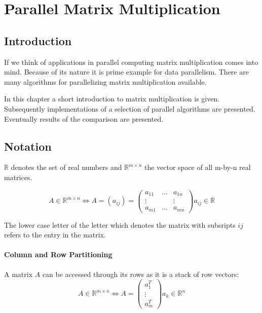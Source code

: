 \chapter{Parallel Matrix Multiplication}
\label{chap:matrix}
\section{Introduction}

If we think of applications in parallel computing matrix
multiplication comes into mind. Because of its nature it is prime
example for data parallelism. There are many algorithms for
parallelizing matrix multiplication available.


In this chapter a short introduction to matrix multiplication is
given. Subsequently implementations of a selection of parallel
algorithms are presented. Eventually results of the comparison are
presented.


\section{Notation}

$ \mathbb{R} $ denotes the set of real numbers and $ \mathbb{R}^{m
  \times n} $ the vector space of all m-by-n real matrices.

$$ A \in \mathbb{R}^{m \times n} \Longleftrightarrow A = (a_{ij}) = 
\left( \begin{array}{ccc}
a_{11} & \ldots & a_{1n} \\
\vdots &        & \vdots \\
a_{m1} & \ldots & a_{mn}
\end{array} \right)
a_{ij} \in \mathbb{R}
 $$

The lower case letter of the letter which denotes the matrix with
subsripts $ij$ refers to the entry in the matrix. 

\subsubsection{Column and Row Partitioning}

A matrix $A$ can be accessed through its rows as it is a stack of row
vectors:
$$ A \in \mathbb{R}^{m \times n} \Longleftrightarrow A = 
\left( \begin{array}{c}
a_{1}^T \\
\vdots \\
a_{m}^T 
\end{array} \right)
a_{k} \in \mathbb{R}^n 
 $$


